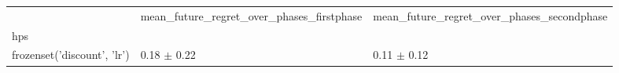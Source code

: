 \begin{tabular}{lll}
\toprule
 & mean_future_regret_over_phases_firstphase & mean_future_regret_over_phases_secondphase \\
hps &  &  \\
\midrule
frozenset({'discount', 'lr'}) & 0.18 $\pm$ 0.22 & 0.11 $\pm$ 0.12 \\
\bottomrule
\end{tabular}
